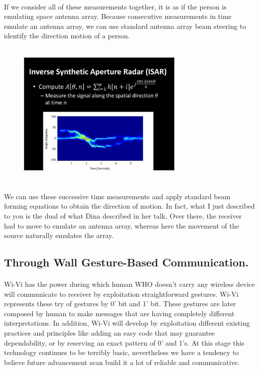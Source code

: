 \documentclass[a4paper,12pt,oneside]{article}
\begin{document}
\paragraph{}
If we consider all of these measurements together, it is as if the person is emulating space
antenna array. Because consecutive measurements in time emulate an antenna array, we can use
standard antenna array beam steering to identify the direction motion of a person.

\begin{figure}[H]
\centering
\includegraphics[height=7cm,width=8cm]{12a.png}
\end{figure}

\paragraph{}
We can use these successive time measurements and apply standard beam forming
equations to obtain the direction of motion.
In fact, what I just described to you is the dual of what Dina described in her talk. Over
there, the receiver had to move to emulate an antenna array, whereas here the movement of the
source naturally emulates the array.

\subsection{Through Wall Gesture-Based Communication.}
\paragraph{}
Wi-Vi has the power during which human WHO doesn't carry any wireless device will
communicate to receiver by exploitation straightforward gestures. Wi-Vi represents these try of
gestures by 0’ bit and 1’ bit. These gestures are later composed by human to make messages that
are having completely different interpretations. In addition, Wi-Vi will develop by exploitation
different existing practices and principles like adding an easy code that may guarantee
dependability, or by reserving an exact pattern of 0’ and 1’s. At this stage this technology
continues to be terribly basic, nevertheless we have a tendency to believe future advancement
scan build it a lot of reliable and communicative.
\end{document}
